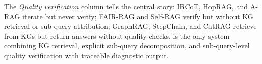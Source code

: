 \begin{table}[t]
{\footnotesize
The \emph{Quality verification} column tells the central story: IRCoT, HopRAG,
and A-RAG iterate but never verify; FAIR-RAG and Self-RAG verify but without KG
retrieval or sub-query attribution; GraphRAG, StepChain, and CatRAG retrieve
from KGs but return answers without quality checks. \sys is the only system
combining KG retrieval, explicit sub-query decomposition, and sub-query-level
quality verification with traceable diagnostic output.
}
\end{table}

